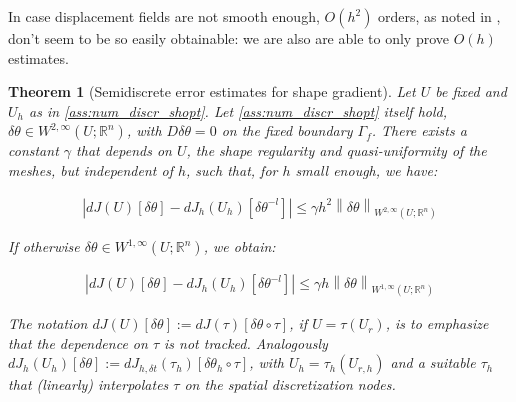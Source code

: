 \documentclass[english,a4paper,9pt,oneside]{scrbook}	%
\theoremstyle{break}
\newtheorem{thm}[equation]{Theorem}
\theoremstyle{remark}
\newcommand{\mR}{\mathbb{R}}
\newcommand{\norm}[1]{\left\lVert#1\right\rVert}
\newcommand{\te}{\theta}
\begin{document}

In case displacement fields are not smooth enough, $O(h^2)$ orders, as noted in \cite{paganini}, don't seem to be so easily obtainable: we are also are able to only prove $O(h)$ estimates.


\begin{thm}[Semidiscrete error estimates for shape gradient]
\label{thm:superconvergence_sd}
Let $U$ be fixed and $U_h$ as in \cref{ass:num_discr_shopt}. Let \cref{ass:num_discr_shopt} itself hold, $\delta \te \in W^{2,\infty}(U;\mR^n)$, with $D\delta \te=0$ on the fixed boundary $\Gamma_f$. There exists a constant $\gamma$ that depends on $U$, the shape regularity and quasi-uniformity of the meshes, but independent of $h$, such that, for $h$ small enough, we have:

\begin{align*}
	\left |dJ(U)[\delta \te] - dJ_h(U_h)[\delta \te^{-l}] \right|\leq \gamma  h^2 \norm{\delta \te}_{W^{2,\infty}(U;\mR^n)}
\end{align*}

If otherwise $\delta \te \in W^{1,\infty}(U;\mR^n)$, we obtain:

\begin{align*}
	\left |dJ(U)[\delta \te] - dJ_h(U_h)[\delta \te^{-l}] \right|\leq \gamma  h\norm{\delta \te}_{W^{1,\infty}(U;\mR^n)}
\end{align*}

The notation $dJ(U)[\delta \te]:=dJ(\tau)[\delta \te\circ \tau]$, if $U=\tau(U_r)$, is to emphasize that the dependence on $\tau$ is not tracked.
Analogously $dJ_{h}(U_h)[\delta \te]:=dJ_{h,\delta t}(\tau_h)[\delta \te_h\circ \tau]$, with $U_h = \tau_h(U_{r,h})$ and a suitable $\tau_h$ that (linearly) interpolates $\tau$ on the spatial discretization nodes.

\end{thm}
\end{document}
